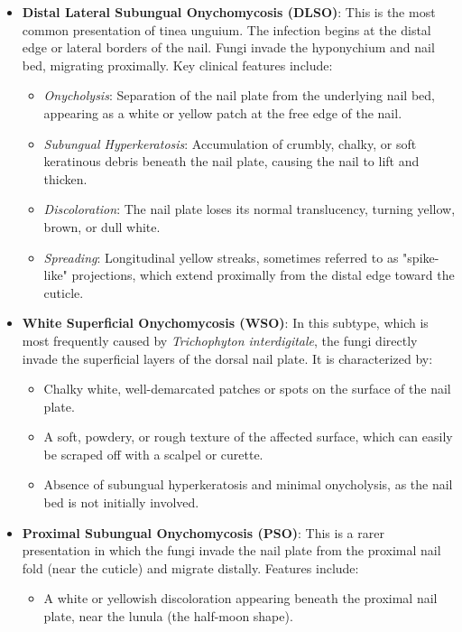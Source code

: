 \begin{itemize}
    \item \textbf{Distal Lateral Subungual Onychomycosis (DLSO)}: This is the most common presentation of tinea unguium. The infection begins at the distal edge or lateral borders of the nail. Fungi invade the hyponychium and nail bed, migrating proximally. Key clinical features include:
    \begin{itemize}
        \item \textit{Onycholysis}: Separation of the nail plate from the underlying nail bed, appearing as a white or yellow patch at the free edge of the nail.
        \item \textit{Subungual Hyperkeratosis}: Accumulation of crumbly, chalky, or soft keratinous debris beneath the nail plate, causing the nail to lift and thicken.
        \item \textit{Discoloration}: The nail plate loses its normal translucency, turning yellow, brown, or dull white.
        \item \textit{Spreading}: Longitudinal yellow streaks, sometimes referred to as "spike-like" projections, which extend proximally from the distal edge toward the cuticle.
    \end{itemize}
    \item \textbf{White Superficial Onychomycosis (WSO)}: In this subtype, which is most frequently caused by \textit{Trichophyton interdigitale}, the fungi directly invade the superficial layers of the dorsal nail plate. It is characterized by:
    \begin{itemize}
        \item Chalky white, well-demarcated patches or spots on the surface of the nail plate.
        \item A soft, powdery, or rough texture of the affected surface, which can easily be scraped off with a scalpel or curette.
        \item Absence of subungual hyperkeratosis and minimal onycholysis, as the nail bed is not initially involved.
    \end{itemize}
    \item \textbf{Proximal Subungual Onychomycosis (PSO)}: This is a rarer presentation in which the fungi invade the nail plate from the proximal nail fold (near the cuticle) and migrate distally. Features include:
    \begin{itemize}
        \item A white or yellowish discoloration appearing beneath the proximal nail plate, near the lunula (the half-moon shape).

\end{itemize}
\end{itemize}
